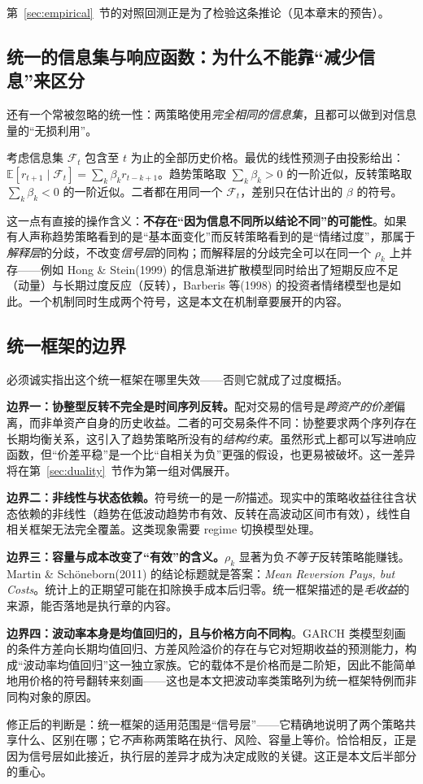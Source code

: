 第~\ref{sec:empirical}~节的对照回测正是为了检验这条推论（见本章末的预告）。

\subsection{统一的信息集与响应函数：为什么不能靠“减少信息”来区分}

还有一个常被忽略的统一性：两策略使用\emph{完全相同的信息集}，且都可以做到对信息量的“无损利用”。

考虑信息集 $\mathcal{F}_t$ 包含至 $t$ 为止的全部历史价格。最优的线性预测子由投影给出：$\mathbb{E}[r_{t+1}\mid\mathcal{F}_t]=\sum_k\beta_k r_{t-k+1}$。趋势策略取 $\sum_k\beta_k>0$ 的一阶近似，反转策略取 $\sum_k\beta_k<0$ 的一阶近似。二者都在用同一个 $\mathcal{F}_t$，差别只在估计出的 $\beta$ 的符号。

这一点有直接的操作含义：\textbf{不存在“因为信息不同所以结论不同”的可能性}。如果有人声称趋势策略看到的是“基本面变化”而反转策略看到的是“情绪过度”，那属于\emph{解释层}的分歧，不改变\emph{信号层}的同构；而解释层的分歧完全可以在同一个 $\rho_k$ 上并存——例如 Hong \& Stein(1999) 的信息渐进扩散模型同时给出了短期反应不足（动量）与长期过度反应（反转）\cite{hongstein1999}，Barberis 等(1998) 的投资者情绪模型也是如此\cite{bsv1998}。一个机制同时生成两个符号，这是本文在机制章要展开的内容。

\subsection{统一框架的边界}

必须诚实指出这个统一框架在哪里失效——否则它就成了过度概括。

\textbf{边界一：协整型反转不完全是时间序列反转。}配对交易的信号是\emph{跨资产的价差}偏离，而非单资产自身的历史收益。二者的可交易条件不同：协整要求两个序列存在长期均衡关系，这引入了趋势策略所没有的\emph{结构约束}。虽然形式上都可以写进响应函数，但“价差平稳”是一个比“自相关为负”更强的假设，也更易被破坏。这一差异将在第~\ref{sec:duality}~节作为第一组对偶展开。

\textbf{边界二：非线性与状态依赖。}符号统一的是\emph{一阶}描述。现实中的策略收益往往含状态依赖的非线性（趋势在低波动趋势市有效、反转在高波动区间市有效），线性自相关框架无法完全覆盖。这类现象需要 regime 切换模型处理\cite{hamilton1989,angtimmermann2012}。

\textbf{边界三：容量与成本改变了“有效”的含义。}$\rho_k$ 显著为负\emph{不等于}反转策略能赚钱。Martin \& Sch\"oneborn(2011) 的结论标题就是答案：\emph{Mean Reversion Pays, but Costs}\cite{martin2011}。统计上的正期望可能在扣除换手成本后归零。统一框架描述的是\emph{毛收益}的来源，能否落地是执行章的内容。

\textbf{边界四：波动率本身是均值回归的，且与价格方向不同构}。GARCH 类模型刻画的条件方差向长期均值回归\cite{bollerslev1986}、方差风险溢价的存在\cite{carrwu2009}与它对短期收益的预测能力\cite{bollerslev2009}，构成“波动率均值回归”这一独立家族。它的载体不是价格而是二阶矩，因此不能简单地用价格的符号翻转来刻画——这也是本文把波动率类策略列为统一框架特例而非同构对象的原因。

修正后的判断是：统一框架的适用范围是“信号层”——它精确地说明了两个策略共享什么、区别在哪；它\emph{不}声称两策略在执行、风险、容量上等价。恰恰相反，正是因为信号层如此接近，执行层的差异才成为决定成败的关键。这正是本文后半部分的重心。
